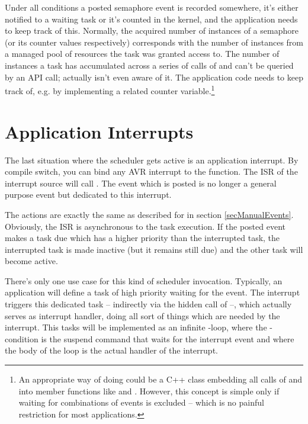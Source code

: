 Under all conditions a posted semaphore event is recorded somewhere, it's
either notified to a waiting task or it's counted in the kernel, and the
application needs to keep track of this. Normally, the acquired number of
instances of a semaphore (or its counter values respectively) corresponds
with the number of instances from a managed pool of resources the task was
granted access to. The number of instances a task has accumulated across a
series of calls of  and 
can't be queried by an API call; actually \rtos{} isn't even aware of it.
The application code needs to keep track of, e.g. by implementing a
related counter variable.\footnote{An appropriate way of doing could be a
C++ class embedding all calls of  and
 into member functions like 
and . However, this concept is simple only if
waiting for combinations of events is excluded -- which is no painful
restriction for most applications.}


\section{Application Interrupts}
\label{secInterruptEvents}

The last situation where the scheduler gets active is an application
interrupt. By compile switch, you can bind any AVR interrupt to the
 function. The ISR of the interrupt source will call
. The event which is posted is no longer a general purpose
event but dedicated to this interrupt.

The actions are exactly the same as described for  in
section \ref{secManualEvents}. Obviously, the ISR is asynchronous to the
task execution. If the posted event makes a task due which has a higher
priority than the interrupted task, the interrupted task is made inactive
(but it remains still due) and the other task will become active.

There's only one use case for this kind of scheduler invocation.
Typically, an application will define a task of high priority waiting for
the event. The interrupt triggers this dedicated task -- indirectly via
the hidden call of  --, which actually serves as
interrupt handler, doing all sort of things which are needed by the
interrupt. This tasks will be implemented as an infinite
-loop, where the -condition is the suspend
command that waits for the interrupt event and where the body of the loop
is the actual handler of the interrupt.


